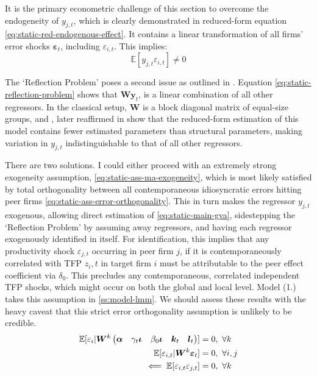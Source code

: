 It is the primary econometric challenge of this section to overcome the endogeneity of $y_{j,t}$,
which is clearly demonstrated in reduced-form equation \eqref{eq:static-red-endogenous-effect}.
It contains a linear transformation of all firms' error shocks $\boldsymbol \varepsilon_{t}$,
including $\varepsilon_{i,t}$. This implies:
\begin{equation}
    \mathbb E[y_{j,t}\varepsilon_{i,t}]\neq 0
\end{equation}
\par
The `Reflection Problem' poses a second issue as outlined in \cite{Manski1993}.
Equation \eqref{eq:static-reflection-problem} shows that $\mathbf W \mathbf y_t$,
is a linear combination of all other regressors. In the classical setup,
$\mathbf W$ is a block diagonal matrix of equal-size groups,
and \cite{Manski1993}, later reaffirmed in \cite{Bramoulle2009}
show that the reduced-form estimation of this model contains fewer estimated parameters
than structural parameters, making variation in $y_{j,t}$ indistinguishable
to that of all other regressors.
\par
There are two solutions. I could either proceed with an extremely strong exogeneity assumption,
\eqref{eq:static-ass-ma-exogeneity}, which is most likely satisfied by total orthogonality
between all contemporaneous idiosyncratic errors hitting peer firms \eqref{eq:static-ass-error-orthogonality}.
This in turn makes the regressor $y_{j,t}$ exogenous,
allowing direct estimation of \eqref{eq:static-main-gva}, sidestepping the `Reflection Problem'
by assuming away  regressors, and having each regressor exogenously identified in itself.
For identification, this implies that any productivity shock $\varepsilon_{j,t}$ occurring in peer firm $j$,
if it is contemporaneously correlated with TFP ${z_i,t}$ in target firm $i$
must be attributable to the peer effect coefficient via  $\delta_0$.
This precludes any contemporaneous, correlated independent TFP shocks,
which might occur on both the global and local level.
Model (1.) takes this assumption in \ref{ss:model-lmm}.
We should assess these results with the heavy caveat that this strict error orthogonality
assumption is unlikely to be credible.
\begin{align}
    \notag
    \mathbb E[
        \varepsilon_i
        \vert
        \boldsymbol W^k
        \begin{pmatrix}
            \boldsymbol\alpha           &
            \gamma_t \boldsymbol\iota   &
            \beta_0\boldsymbol\iota     &
            \boldsymbol k_t             &
            \boldsymbol l_t             
        \end{pmatrix}
    ] &=0,\  \forall k
    \\
    \label{eq:static-ass-ma-exogeneity}
    \mathbb E[
        \varepsilon_{i,t}
        \vert
        \boldsymbol W^k
        \boldsymbol \varepsilon_t
    ] &=0,\  
    \forall i,j
    \\
    \label{eq:static-ass-error-orthogonality}
    \impliedby \mathbb E[\varepsilon_{i,t}\varepsilon_{j,t}] &= 0,\ \forall k
\end{align}

